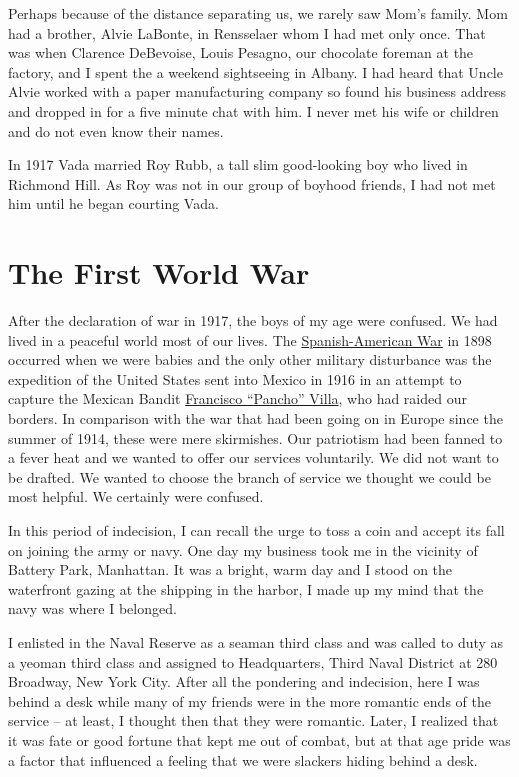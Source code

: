 \documentclass[12pt]{book}              %
\begin{document}
Perhaps because of the distance separating us, we rarely saw Mom's family. Mom had a brother, Alvie LaBonte, in Rensselaer whom I had met only once. That was when Clarence DeBevoise, Louis Pesagno, our chocolate foreman at the factory, and I spent the a weekend sightseeing in Albany. I had heard that Uncle Alvie worked with a paper manufacturing company so found his business address and dropped in for a five minute chat with him. I never met his wife or children and do not even know their names.

In 1917 Vada married Roy Rubb, a tall slim good-looking boy who lived in Richmond Hill. As Roy was not in our group of boyhood friends, I had not met him until he began courting Vada.

\chapter{The First World War}

After the declaration of war in 1917, the boys of my age were confused. We had lived in a peaceful world most of our lives. The \href{http://en.wikipedia.org/wiki/Spanish-American_War}{Spanish-American War} in 1898 occurred when we were babies and the only other military disturbance was the expedition of the United States sent into Mexico in 1916 in an attempt to capture the Mexican Bandit \href{http://en.wikipedia.org/wiki/Pancho_Villa}{Francisco ``Pancho'' Villa}, who had raided our borders. In comparison with the war that had been going on in Europe since the summer of 1914, these were mere skirmishes. Our patriotism had been fanned to a fever heat and we wanted to offer our services voluntarily. We did not want to be drafted. We wanted to choose the branch of service we thought we could be most helpful. We certainly were confused. 

In this period of indecision, I can recall the urge to toss a coin and accept its fall on joining the army or navy. One day my business took me in the vicinity of Battery Park, Manhattan. It was a bright, warm day and I stood on the waterfront gazing at the shipping in the harbor, I made up my mind that the navy was where I belonged. 

I enlisted in the Naval Reserve as a seaman third class and was called to duty as a yeoman third class and assigned to Headquarters, Third Naval District at 280 Broadway, New York City. After all the pondering and indecision, here I was behind a desk while many of my friends were in the more romantic ends of the service -- at least, I thought then that they were romantic. Later, I realized that it was fate or good fortune that kept me out of combat, but at that age pride was a factor that influenced a feeling that we were slackers hiding behind a desk.
\end{document}
